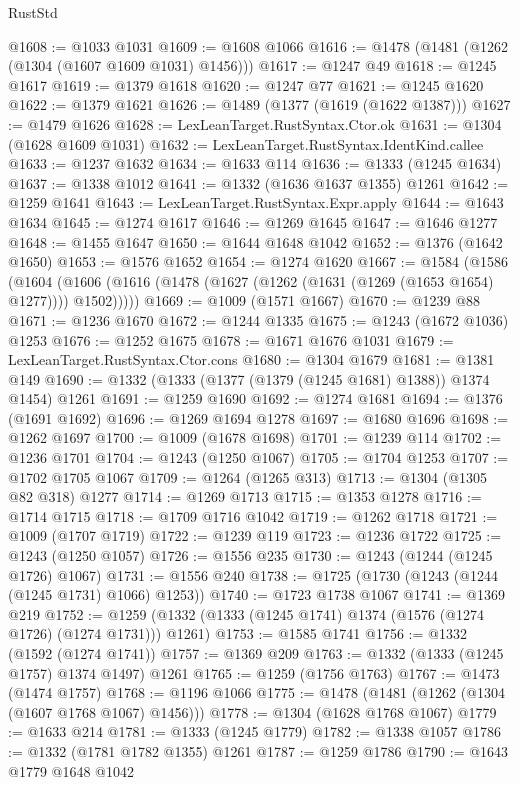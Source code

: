 \begin{lexlean}{RustStd}
\begin{coremodule}
@1608 := @1033 @1031
@1609 := @1608 @1066
@1616 := @1478 (@1481 (@1262 (@1304 (@1607 @1609 @1031) @1456)))
@1617 := @1247 @49
@1618 := @1245 @1617
@1619 := @1379 @1618
@1620 := @1247 @77
@1621 := @1245 @1620
@1622 := @1379 @1621
@1626 := @1489 (@1377 (@1619 (@1622 @1387)))
@1627 := @1479 @1626
@1628 := LexLeanTarget.RustSyntax.Ctor.ok
@1631 := @1304 (@1628 @1609 @1031)
@1632 := LexLeanTarget.RustSyntax.IdentKind.callee
@1633 := @1237 @1632
@1634 := @1633 @114
@1636 := @1333 (@1245 @1634)
@1637 := @1338 @1012
@1641 := @1332 (@1636 @1637 @1355) @1261
@1642 := @1259 @1641
@1643 := LexLeanTarget.RustSyntax.Expr.apply
@1644 := @1643 @1634
@1645 := @1274 @1617
@1646 := @1269 @1645
@1647 := @1646 @1277
@1648 := @1455 @1647
@1650 := @1644 @1648 @1042
@1652 := @1376 (@1642 @1650)
@1653 := @1576 @1652
@1654 := @1274 @1620
@1667 := @1584
    (@1586
      (@1604 (@1606 (@1616 (@1478 (@1627 (@1262 (@1631 (@1269 (@1653 @1654) @1277)))) @1502)))))
@1669 := @1009 (@1571 @1667)
@1670 := @1239 @88
@1671 := @1236 @1670
@1672 := @1244 @1335
@1675 := @1243 (@1672 @1036) @1253
@1676 := @1252 @1675
@1678 := @1671 @1676 @1031
@1679 := LexLeanTarget.RustSyntax.Ctor.cons
@1680 := @1304 @1679
@1681 := @1381 @149
@1690 := @1332 (@1333 (@1377 (@1379 (@1245 @1681) @1388)) @1374 @1454) @1261
@1691 := @1259 @1690
@1692 := @1274 @1681
@1694 := @1376 (@1691 @1692)
@1696 := @1269 @1694 @1278
@1697 := @1680 @1696
@1698 := @1262 @1697
@1700 := @1009 (@1678 @1698)
@1701 := @1239 @114
@1702 := @1236 @1701
@1704 := @1243 (@1250 @1067)
@1705 := @1704 @1253
@1707 := @1702 @1705 @1067
@1709 := @1264 (@1265 @313)
@1713 := @1304 (@1305 @82 @318) @1277
@1714 := @1269 @1713
@1715 := @1353 @1278
@1716 := @1714 @1715
@1718 := @1709 @1716 @1042
@1719 := @1262 @1718
@1721 := @1009 (@1707 @1719)
@1722 := @1239 @119
@1723 := @1236 @1722
@1725 := @1243 (@1250 @1057)
@1726 := @1556 @235
@1730 := @1243 (@1244 (@1245 @1726) @1067)
@1731 := @1556 @240
@1738 := @1725 (@1730 (@1243 (@1244 (@1245 @1731) @1066) @1253))
@1740 := @1723 @1738 @1067
@1741 := @1369 @219
@1752 := @1259 (@1332 (@1333 (@1245 @1741) @1374 (@1576 (@1274 @1726) (@1274 @1731))) @1261)
@1753 := @1585 @1741
@1756 := @1332 (@1592 (@1274 @1741))
@1757 := @1369 @209
@1763 := @1332 (@1333 (@1245 @1757) @1374 @1497) @1261
@1765 := @1259 (@1756 @1763)
@1767 := @1473 (@1474 @1757)
@1768 := @1196 @1066
@1775 := @1478 (@1481 (@1262 (@1304 (@1607 @1768 @1067) @1456)))
@1778 := @1304 (@1628 @1768 @1067)
@1779 := @1633 @214
@1781 := @1333 (@1245 @1779)
@1782 := @1338 @1057
@1786 := @1332 (@1781 @1782 @1355) @1261
@1787 := @1259 @1786
@1790 := @1643 @1779 @1648 @1042

\end{coremodule}
\end{lexlean}

